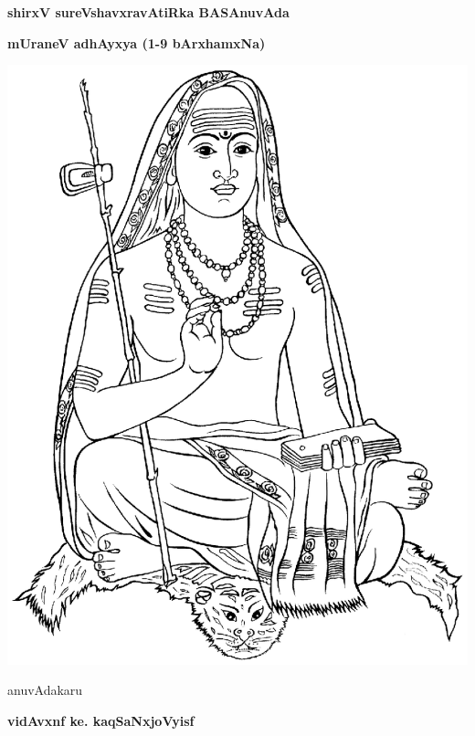 \thispagestyle{empty}
\begin{center}
{\Huge\bfseries shirxV sureVshavxravAtiRka BASAnuvAda}
\bigskip

{\Large\bfseries mUraneV adhAyxya (1-9 bArxhamxNa)}
\bigskip

\vfill

\includegraphics[scale=0.7]{figures/shankaracharya.eps}

\vfill

anuvAdakaru
\smallskip

{\large\bfseries vidAvxnf ke. kaqSaNxjoVyisf}


\end{center}
